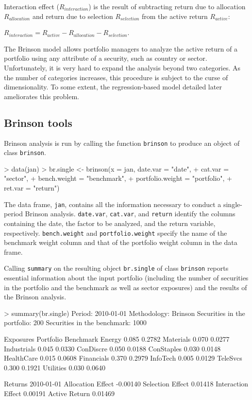 Interaction effect ($R_{interaction}$) is the result of subtracting
return due to allocation $R_{allocation}$ and return due to selection
$R_{selection}$ from the active return $R_{active}$:
\begin{center}
  $R_{interaction} = R_{active} - R_{allocation} - R_{selection}$.
\end{center}

The Brinson model allows portfolio managers to analyze the active
return of a portfolio using any attribute of a security, such as
country or sector. Unfortunately, it is very hard to expand the
analysis beyond two categories. As the number of categories increases,
this procedure is subject to the curse of dimensionality. To some
extent, the regression-based model detailed later ameliorates this
problem.
\subsection{Brinson tools}

Brinson analysis is run by calling the function \texttt{brinson} to
produce an object of class \texttt{brinson}. 
\begin{smallverbatim}
> data(jan)
> br.single <- brinson(x = jan, date.var = "date", 
+            cat.var = "sector",
+            bench.weight = "benchmark", 
+            portfolio.weight = "portfolio", 
+            ret.var = "return")
\end{smallverbatim}

The data frame, \texttt{jan}, contains all the information necessary
to conduct a single-period Brinson analysis. \texttt{date.var},
\texttt{cat.var}, and \texttt{return} identify the columns containing
the date, the factor to be analyzed, and the return variable,
respectively. \texttt{bench.weight} and \texttt{portfolio.weight}
specify the name of the benchmark weight column and that of the
portfolio weight column in the data frame.

Calling \texttt{summary} on the resulting object \texttt{br.single} of
class \texttt{brinson} reports essential information about the input
portfolio (including the number of securities in the portfolio and the
benchmark as well as sector exposures) and the results of the Brinson
analysis.

\begin{smallverbatim}
> summary(br.single)
Period:                            2010-01-01
Methodology:                       Brinson
Securities in the portfolio:       200
Securities in the benchmark:       1000

Exposures 
            Portfolio Benchmark
Energy          0.085    0.2782
Materials       0.070    0.0277
Industrials     0.045    0.0330
ConDiscre       0.050    0.0188
ConStaples      0.030    0.0148
HealthCare      0.015    0.0608
Financials      0.370    0.2979
InfoTech        0.005    0.0129
TeleSvcs        0.300    0.1921
Utilities       0.030    0.0640

Returns 
                   2010-01-01
Allocation Effect    -0.00140
Selection Effect      0.01418
Interaction Effect    0.00191
Active Return         0.01469
\end{smallverbatim}


